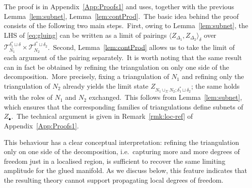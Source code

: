 \documentclass[11pt]{article}
\theoremstyle{definition}
\numberwithin{equation}{section}
\begin{document}
The proof is in Appendix~\ref{App:Proofs1} and uses, together with the previous Lemma~\ref{lem:subnet}, Lemma~\ref{lem:contProd}.~The basic idea behind the proof consists of the following two main steps.~First, owing to Lemma~\ref{lem:subnet}, the LHS of \eqref{eq:gluing} can be written as a limit of pairings $\langle Z_{\Delta_1},Z_{\Delta_2}\rangle_{\delta}$ over $\mathcal{T}_{N_1}^{\delta_1^* \sqcup \delta}\times \mathcal{T}_{N_2}^{\delta^* \sqcup \delta_2}$.~Second,  Lemma~\ref{lem:contProd} allows us to take the limit of each argument of the pairing separately.~It is worth noting that the same result can in fact be obtained by refining the triangulation on only one side of the decomposition.~More precisely, fixing a triangulation of $N_1$ and refining only the triangulation of $N_2$ already yields the limit state $Z_{N_1\cup_\Sigma N_2;\delta_1^*\sqcup\delta_2}$; the same holds with the roles of $N_1$ and $N_2$ exchanged.~This follows from Lemma~\ref{lem:subnet}, which ensures that the corresponding families of triangulations define subnets of $Z_\bullet$.~The technical argument is given in Remark~\ref{rmk:loc-ref} of Appendix~\ref{App:Proofs1}. 

This behaviour has a clear conceptual interpretation: refining the triangulation only on one side of the decomposition, i.e.\ capturing more and more degrees of freedom just in a localised region, is sufficient to recover the same limiting amplitude for the glued manifold. As we discuss below, this feature indicates that the resulting theory cannot support propagating local degrees of freedom.
\end{document}
